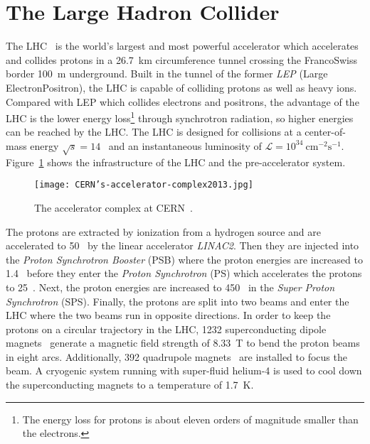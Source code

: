 
\section{The Large Hadron Collider}
\label{sec:ae_LHC}
The LHC~\cite{Evans:2008zzb} is the world's largest and most powerful accelerator which accelerates and collides protons in a 26.7~km circumference tunnel crossing the Franco\textendash Swiss border 100~m underground.
Built in the tunnel of the former \textit{LEP} (Large Electron\textendash Positron), the LHC is capable of colliding protons as well as heavy ions.
Compared with LEP which collides electrons and positrons, the advantage of the LHC is the lower energy loss\footnote{The energy loss for protons is about eleven orders of magnitude smaller than the electrons.} through synchrotron radiation, so higher energies can be reached by the LHC.
The LHC is designed for collisions at a center-of-mass energy $\sqrt{s}=14$~{\TeV} and an instantaneous luminosity of $\mathcal{L} =10^{34}~\textrm{cm}^{-2}\textrm{s}^{-1}$.
Figure~\ref{fig:ae_CERN_accelerator_complex} shows the infrastructure of the LHC and the pre-accelerator system.

\begin{figure}[htbp]
    \begin{center}
        \texttt{[image: CERN's-accelerator-complex2013.jpg]}
        \caption{The accelerator complex at CERN~\cite{Marcastel:1621583}.}
        \label{fig:ae_CERN_accelerator_complex}
    \end{center}
\end{figure}

The protons are extracted by ionization from a hydrogen source and are accelerated to 50~{\MeV} by the linear accelerator \textit{LINAC2}.
Then they are injected into the \textit{Proton Synchrotron Booster} (PSB) where the proton energies are increased to 1.4~{\GeV} before they enter the \textit{Proton Synchrotron} (PS) which accelerates the protons to 25~{\GeV}.
Next, the proton energies are increased to 450~{\GeV} in the \textit{Super Proton Synchrotron} (SPS). 
Finally, the protons are split into two beams and enter the LHC where the two beams run in opposite directions.
In order to keep the protons on a circular trajectory in the LHC, 1232 superconducting dipole magnets~\cite{Rossi:2003np} generate a magnetic field strength of 8.33~T to bend the proton beams in eight arcs.
Additionally, 392 quadrupole magnets~\cite{Rossi:2003np} are installed to focus the beam.
A cryogenic system running with super-fluid helium-4 is used to cool down the superconducting magnets to a temperature of 1.7~K.

